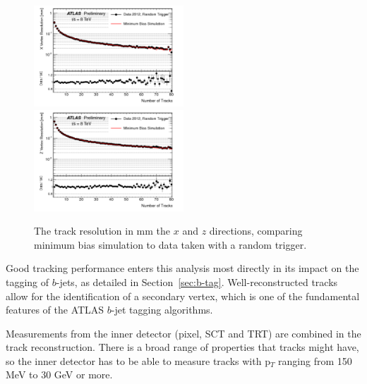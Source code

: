 \begin{figure}
	\includegraphics[width=0.5\textwidth]{ReconstructionPerformance/images/track_perf3.pdf}
	\includegraphics[width=0.5\textwidth]{ReconstructionPerformance/images/track_perf4.pdf}
	\label{fig:track_perfB}  
	\caption{The track resolution in mm the $x$ and $z$ directions, comparing minimum bias simulation to data taken with a random trigger.}
\end{figure}

Good tracking performance enters this analysis most directly in its impact on the tagging of $b$-jets, as detailed in Section~\ref{sec:b-tag}.  Well-reconstructed tracks allow for the identification of a secondary vertex, which is one of the fundamental features of the ATLAS $b$-jet tagging algorithms.


Measurements from the inner detector (pixel, SCT and TRT) are combined in the track reconstruction.  There is a broad range 
of properties that tracks might have, so the inner detector has to be able to measure tracks with p$_T$
 ranging from 150 MeV to 30 GeV or more.   

